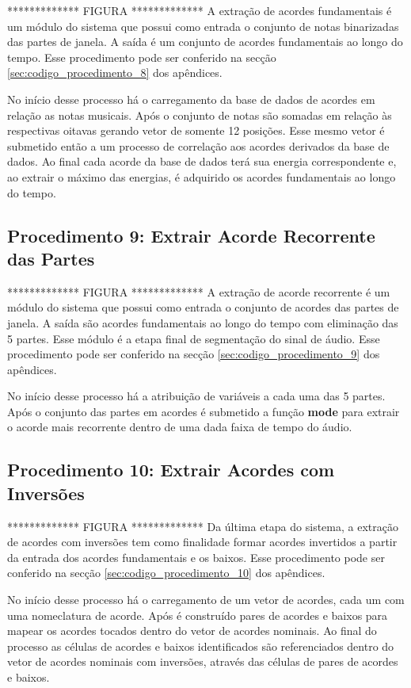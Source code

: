 ************* FIGURA *************
A extração de acordes fundamentais é um módulo do sistema que possui como entrada o conjunto de notas binarizadas das partes de janela. A saída é um conjunto de acordes fundamentais ao longo do tempo. Esse procedimento pode ser conferido na secção \ref{sec:codigo_procedimento_8} dos apêndices.

No início desse processo há o carregamento da base de dados de acordes em relação as notas musicais. Após o conjunto de notas são somadas em relação às respectivas oitavas gerando vetor de somente 12 posições. Esse mesmo vetor é submetido então a um processo de correlação aos acordes derivados da base de dados. Ao final cada acorde da base de dados terá sua energia correspondente e, ao extrair o máximo das energias, é adquirido os acordes fundamentais ao longo do tempo.

\subsection{Procedimento 9: Extrair Acorde Recorrente das Partes}
\label{subsec:procedimento_9}

************* FIGURA *************
A extração de acorde recorrente é um módulo do sistema que possui como entrada o conjunto de acordes das partes de janela. A saída são acordes fundamentais ao longo do tempo com eliminação das 5 partes. Esse módulo é a etapa final de segmentação do sinal de áudio. Esse procedimento pode ser conferido na secção \ref{sec:codigo_procedimento_9} dos apêndices.


No início desse processo há a atribuição de variáveis a cada uma das 5 partes. Após o conjunto das partes em acordes é submetido a função \textbf{mode} para extrair o acorde mais recorrente dentro de uma dada faixa de tempo do áudio.


\subsection{Procedimento 10: Extrair Acordes com Inversões}
\label{subsec:procedimento_10}

************* FIGURA *************
Da última etapa do sistema, a extração de acordes com inversões tem como finalidade formar acordes invertidos a partir da entrada dos acordes fundamentais e os baixos. Esse procedimento pode ser conferido na secção \ref{sec:codigo_procedimento_10} dos apêndices.

No início desse processo há o carregamento de um vetor de acordes, cada um com uma nomeclatura de acorde. Após é construído pares de acordes e baixos para mapear os acordes tocados dentro do vetor de acordes nominais. Ao final do processo as células de acordes e baixos identificados são referenciados dentro do vetor de acordes nominais com inversões, através das células de pares de acordes e baixos.



